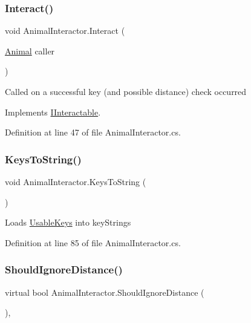 \subsubsection{\texorpdfstring{Interact()}{Interact()}}
{\footnotesize\ttfamily void Animal\+Interactor.\+Interact (\begin{DoxyParamCaption}\item[{\mbox{\hyperlink{class_animal}{Animal}}}]{caller }\end{DoxyParamCaption})}



Called on a successful key (and possible distance) check occurred



Implements \mbox{\hyperlink{interface_i_interactable_ae38fb77e97bc1066db045b32db647681}{I\+Interactable}}.



Definition at line 47 of file Animal\+Interactor.\+cs.

\mbox{\label{class_animal_interactor_ab391bd0cc25697723efb18162d4cfbcc}} 
\subsubsection{\texorpdfstring{Keys\+To\+String()}{KeysToString()}}
{\footnotesize\ttfamily void Animal\+Interactor.\+Keys\+To\+String (\begin{DoxyParamCaption}{ }\end{DoxyParamCaption})\hspace{0.3cm}{\ttfamily [protected]}}



Loads \mbox{\hyperlink{class_animal_interactor_a7de0dae23f6270d02fb18a1fcd9daeb1}{Usable\+Keys}} into key\+Strings 



Definition at line 85 of file Animal\+Interactor.\+cs.

\mbox{\label{class_animal_interactor_aa69a72f1594b510e34f70b55d6d72564}} 
\subsubsection{\texorpdfstring{Should\+Ignore\+Distance()}{ShouldIgnoreDistance()}}
{\footnotesize\ttfamily virtual bool Animal\+Interactor.\+Should\+Ignore\+Distance (\begin{DoxyParamCaption}{ }\end{DoxyParamCaption})\hspace{0.3cm}{\ttfamily [protected]}, {\ttfamily [virtual]}}



